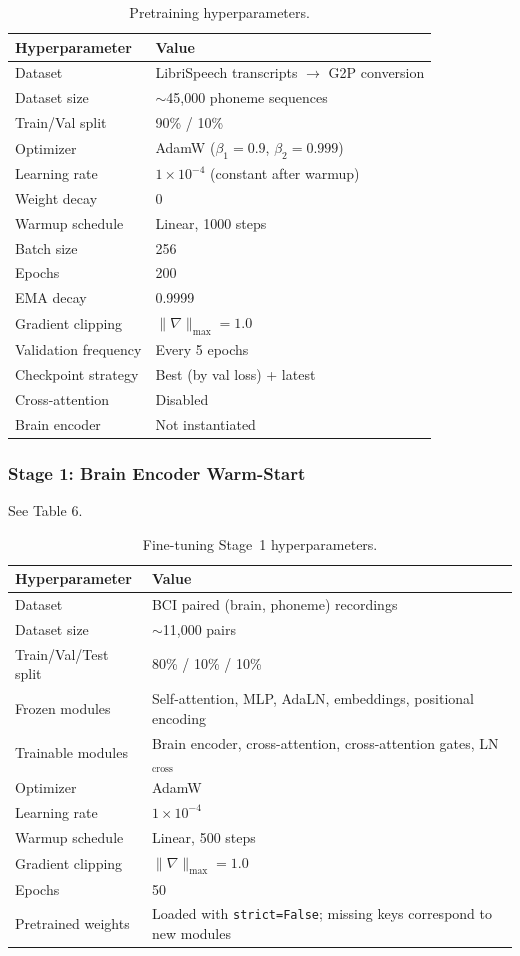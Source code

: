 \documentclass{article}
\begin{document}
\begin{table}[h]
\centering
\caption{Pretraining hyperparameters.}
\label{tab:pretrain}
\begin{tabular}{ll}
\toprule
\textbf{Hyperparameter} & \textbf{Value} \\
\midrule
Dataset & LibriSpeech transcripts $\rightarrow$ G2P conversion \\
Dataset size & $\sim$45,000 phoneme sequences \\
Train/Val split & 90\% / 10\% \\
Optimizer & AdamW ($\beta_1 = 0.9$, $\beta_2 = 0.999$) \\
Learning rate & $1 \times 10^{-4}$ (constant after warmup) \\
Weight decay & 0 \\
Warmup schedule & Linear, 1000 steps \\
Batch size & 256 \\
Epochs & 200 \\
EMA decay & 0.9999 \\
Gradient clipping & $\|\nabla\|_{\max} = 1.0$ \\
Validation frequency & Every 5 epochs \\
Checkpoint strategy & Best (by val loss) + latest \\
Cross-attention & Disabled \\
Brain encoder & Not instantiated \\
\bottomrule
\end{tabular}
\end{table}
 
\subsubsection{Stage 1: Brain Encoder Warm-Start}
See Table 6.
 
\begin{table}[h]
\centering
\caption{Fine-tuning Stage~1 hyperparameters.}
\label{tab:finetune_s1}
\begin{tabular}{ll}
\toprule
\textbf{Hyperparameter} & \textbf{Value} \\
\midrule
Dataset & BCI paired (brain, phoneme) recordings \\
Dataset size & $\sim$11,000 pairs \\
Train/Val/Test split & 80\% / 10\% / 10\% \\
Frozen modules & Self-attention, MLP, AdaLN, embeddings, positional encoding \\
Trainable modules & Brain encoder, cross-attention, cross-attention gates, LN$_{\text{cross}}$ \\
Optimizer & AdamW \\
Learning rate & $1 \times 10^{-4}$ \\
Warmup schedule & Linear, 500 steps \\
Gradient clipping & $\|\nabla\|_{\max} = 1.0$ \\
Epochs & 50 \\
Pretrained weights & Loaded with \texttt{strict=False}; missing keys correspond to new modules \\
\bottomrule
\end{tabular}
\end{table}
 
\end{document}

